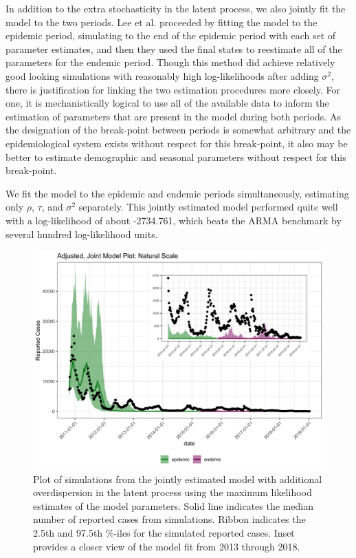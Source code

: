\documentclass[12pt]{article}
\begin{document}
  In addition to the extra stochasticity in the latent process, we also jointly fit the model to the two periods. Lee et al. proceeded by fitting the model to the epidemic period, simulating to the end of the epidemic period with each set of parameter estimates, and then they used the final states to reestimate all of the parameters for the endemic period. Though this method did achieve relatively good looking simulations with reasonably high log-likelihoods after adding $\sigma^2$, there is justification for linking the two estimation procedures more closely. For one, it is mechanistically logical to use all of the available data to inform the estimation of parameters that are present in the model during both periods. As the designation of the break-point between periods is somewhat arbitrary and the epidemiological system exists without respect for this break-point, it also may be better to estimate demographic and seasonal parameters without respect for this break-point.
  
  We fit the model to the epidemic and endemic periods simultaneously, estimating only $\rho$, $\tau$, and $\sigma^2$ separately. This jointly estimated model performed quite well with a log-likelihood of about -2734.761, which beats the ARMA benchmark by several hundred log-likelihood units.
        \begin{figure}[H]
          \centering
          \includegraphics[width=150mm]{joint_inset.png}
          \caption{Plot of simulations from the jointly estimated model with additional overdispersion in the latent process using the maximum likelihood estimates of the model parameters. Solid line indicates the median number of reported cases from simulations. Ribbon indicates the 2.5th and 97.5th \%-iles for the simulated reported cases. Inset provides a closer view of the model fit from 2013 through 2018.}
        \end{figure}
\end{document}
